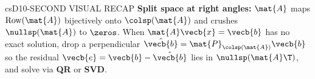 \documentclass[../../../../master.tex]{subfiles}
\begin{document}
\begin{cscolumns}
\begin{cscard}{csD}{10-SECOND VISUAL RECAP}
  \sffamily\footnotesize
  \textbf{Split space at right angles:} $\mat{A}$ maps $\mathrm{Row}(\mat{A})$ bijectively onto $\colsp(\mat{A})$ and crushes $\nullsp(\mat{A})$ to $\zeros$.
  When $\mat{A}\vecb{x}=\vecb{b}$ has no exact solution, drop a perpendicular $\hat{\vecb{b}}=\mat{P}_{\colsp(\mat{A})}\vecb{b}$ so the residual $\vecb{e}=\vecb{b}-\hat{\vecb{b}}$ lies in $\nullsp(\mat{A}\T)$, and solve via \textbf{QR} or \textbf{SVD}.
\end{cscard}
\end{cscolumns}

\csend
\end{document}
